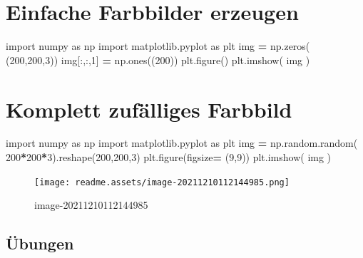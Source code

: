 \documentclass[
  oneside]{book}
\newenvironment{Shaded}{\begin{snugshade}}{\end{snugshade}}
\newcommand{\DecValTok}[1]{\textcolor[rgb]{0.00,0.00,0.81}{#1}}
\newcommand{\ImportTok}[1]{#1}
\newcommand{\NormalTok}[1]{#1}
\newcommand{\OperatorTok}[1]{\textcolor[rgb]{0.81,0.36,0.00}{\textbf{#1}}}
\begin{document}
\hypertarget{einfache-farbbilder-erzeugen}{%
\section{Einfache Farbbilder erzeugen}\label{einfache-farbbilder-erzeugen}}

\begin{Shaded}
\begin{Highlighting}[]
\ImportTok{import}\NormalTok{ numpy }\ImportTok{as}\NormalTok{ np}
\ImportTok{import}\NormalTok{ matplotlib.pyplot }\ImportTok{as}\NormalTok{ plt}
\NormalTok{img }\OperatorTok{=}\NormalTok{ np.zeros( (}\DecValTok{200}\NormalTok{,}\DecValTok{200}\NormalTok{,}\DecValTok{3}\NormalTok{))}
\NormalTok{img[:,:,}\DecValTok{1}\NormalTok{] }\OperatorTok{=}\NormalTok{ np.ones((}\DecValTok{200}\NormalTok{))}
\NormalTok{plt.figure()}
\NormalTok{plt.imshow( img  )}
\end{Highlighting}
\end{Shaded}

\hypertarget{komplett-zufuxe4lliges-farbbild}{%
\section{Komplett zufälliges Farbbild}\label{komplett-zufuxe4lliges-farbbild}}

\begin{Shaded}
\begin{Highlighting}[]
\ImportTok{import}\NormalTok{ numpy }\ImportTok{as}\NormalTok{ np}
\ImportTok{import}\NormalTok{ matplotlib.pyplot }\ImportTok{as}\NormalTok{ plt}
\NormalTok{img }\OperatorTok{=}\NormalTok{ np.random.random( }\DecValTok{200}\OperatorTok{*}\DecValTok{200}\OperatorTok{*}\DecValTok{3}\NormalTok{).reshape(}\DecValTok{200}\NormalTok{,}\DecValTok{200}\NormalTok{,}\DecValTok{3}\NormalTok{)}
\NormalTok{plt.figure(figsize}\OperatorTok{=}\NormalTok{ (}\DecValTok{9}\NormalTok{,}\DecValTok{9}\NormalTok{))}
\NormalTok{plt.imshow( img  )}
\end{Highlighting}
\end{Shaded}

\begin{figure}
\centering
\texttt{[image: readme.assets/image-20211210112144985.png]}
\caption{image-20211210112144985}
\end{figure}

\hypertarget{uxfcbungen-1}{%
\subsection{Übungen}\label{uxfcbungen-1}}
\end{document}
